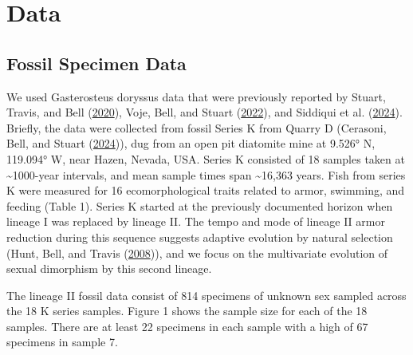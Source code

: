 \documentclass[
  12pt,
]{article}
\begin{document}
\hypertarget{sec:data}{%
\section{Data}\label{sec:data}}

\hypertarget{fossil-specimen-data}{%
\subsection{Fossil Specimen Data}\label{fossil-specimen-data}}

We used Gasterosteus doryssus data that were previously reported by
Stuart, Travis, and Bell (\protect\hyperlink{ref-Stuartetal2020}{2020}),
Voje, Bell, and Stuart (\protect\hyperlink{ref-Vojeetal2022}{2022}), and
Siddiqui et al. (\protect\hyperlink{ref-Siddiquietal2024}{2024}).
Briefly, the data were collected from fossil Series K from Quarry D
(Cerasoni, Bell, and Stuart
(\protect\hyperlink{ref-Cerasonietal2024}{2024})), dug from an open pit
diatomite mine at 9.526° N, 119.094° W, near Hazen, Nevada, USA. Series
K consisted of 18 samples taken at \textasciitilde1000-year intervals,
and mean sample times span \textasciitilde16,363 years. Fish from series
K were measured for 16 ecomorphological traits related to armor,
swimming, and feeding (Table 1). Series K started at the previously
documented horizon when lineage I was replaced by lineage II. The tempo
and mode of lineage II armor reduction during this sequence suggests
adaptive evolution by natural selection (Hunt, Bell, and Travis
(\protect\hyperlink{ref-Huntetal2008}{2008})), and we focus on the
multivariate evolution of sexual dimorphism by this second lineage.

The lineage II fossil data consist of 814 specimens of unknown sex
sampled across the 18 K series samples. Figure 1 shows the sample size
for each of the 18 samples. There are at least 22 specimens in each
sample with a high of 67 specimens in sample 7.
\end{document}
